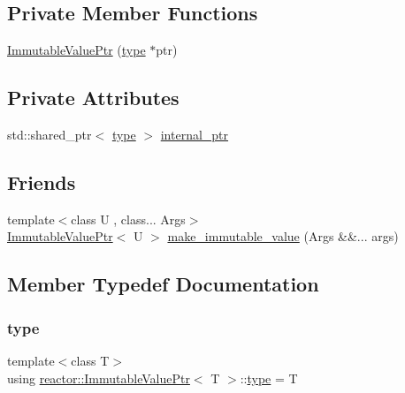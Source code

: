 \subsection*{Private Member Functions}
\begin{DoxyCompactItemize}
\item 
\hyperlink{classreactor_1_1ImmutableValuePtr_ae0d6edc13d77e9a68811d200c02fef84}{Immutable\+Value\+Ptr} (\hyperlink{classreactor_1_1ImmutableValuePtr_a88dbe82ff9b732b87e054ee37254bdfa}{type} $\ast$ptr)
\end{DoxyCompactItemize}
\subsection*{Private Attributes}
\begin{DoxyCompactItemize}
\item 
std\+::shared\+\_\+ptr$<$ \hyperlink{classreactor_1_1ImmutableValuePtr_a88dbe82ff9b732b87e054ee37254bdfa}{type} $>$ \hyperlink{classreactor_1_1ImmutableValuePtr_afe0edfdeed222658f79ce58dc2d8a0d6}{internal\+\_\+ptr}
\end{DoxyCompactItemize}
\subsection*{Friends}
\begin{DoxyCompactItemize}
\item 
{\footnotesize template$<$class U , class... Args$>$ }\\\hyperlink{classreactor_1_1ImmutableValuePtr}{Immutable\+Value\+Ptr}$<$ U $>$ \hyperlink{classreactor_1_1ImmutableValuePtr_a9fe212a2e336629d1f6df1b337f58c3f}{make\+\_\+immutable\+\_\+value} (Args \&\&... args)
\end{DoxyCompactItemize}


\subsection{Member Typedef Documentation}
\mbox{\label{classreactor_1_1ImmutableValuePtr_a88dbe82ff9b732b87e054ee37254bdfa}} 
\subsubsection{\texorpdfstring{type}{type}}
{\footnotesize\ttfamily template$<$class T$>$ \\
using \hyperlink{classreactor_1_1ImmutableValuePtr}{reactor\+::\+Immutable\+Value\+Ptr}$<$ T $>$\+::\hyperlink{classreactor_1_1ImmutableValuePtr_a88dbe82ff9b732b87e054ee37254bdfa}{type} =  T}



